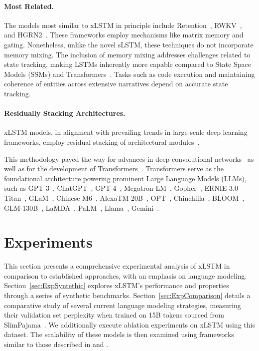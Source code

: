 \paragraph{Most Related.} The models most similar to xLSTM in principle include Retention~\citep{Sun:23arxiv}, RWKV~\citep{Peng:23arxivshort,Peng:24arxivshort}, and HGRN2~\citep{Qin:24arxiv}. These frameworks employ mechanisms like matrix memory and gating. Nonetheless, unlike the novel sLSTM, these techniques do not incorporate memory mixing. The inclusion of memory mixing addresses challenges related to state tracking, making LSTMs inherently more capable compared to State Space Models (SSMs) and Transformers~\citep{Merrill:24,Deletang:23}. Tasks such as code execution and maintaining coherence of entities across extensive narratives depend on accurate state tracking.

\paragraph{Residually Stacking Architectures.} xLSTM models, in alignment with prevailing trends in large-scale deep learning frameworks, employ residual stacking of architectural modules~\citep{Srivastava:15,He:16}.

This methodology paved the way for advances in deep convolutional networks~\citep{He:16} as well as for the development of Transformers~\citep{Vaswani:17}. Transformers serve as the foundational architecture powering prominent Large Language Models (LLMs), such as GPT-3~\citep{Brown:20short}, ChatGPT~\citep{Schulman:22short}, GPT-4~\citep{Achiam:23gpt4short}, Megatron-LM~\citep{Shoeybi:19}, Gopher~\citep{Rae:21short}, ERNIE 3.0 Titan~\citep{Wang:21arxivshort}, GLaM~\citep{Du:21glamshort}, Chinese M6~\citep{Lin:21}, AlexaTM 20B~\citep{Soltan:22}, OPT~\citep{Zhang:22opt}, Chinchilla~\citep{Hoffmann:22short}, BLOOM~\citep{Scao:22arxivshort}, GLM-130B~\citep{Zeng:22arxivshort}, LaMDA~\citep{Thoppilan:22short}, PaLM~\citep{Chowdhery:22short}, Llama~\citep{Touvron:23arxiv}, Gemini~\citep{GeminiTeam:23arxiv,Reid:24arxiv}.

\section{Experiments}
\label{sec:Exp}

This section presents a comprehensive experimental analysis of xLSTM in comparison to established approaches, with an emphasis on language modeling. Section~\ref{sec:ExpSyntethic} explores xLSTM's performance and properties through a series of synthetic benchmarks. Section~\ref{sec:ExpComparison} details a comparative study of several current language modeling strategies, measuring their validation set perplexity when trained on 15B tokens sourced from SlimPajama~\citep{Soboleva:23}. We additionally execute ablation experiments on xLSTM using this dataset. The scalability of these models is then examined using frameworks similar to those described in \citet{Kaplan:20} and \citet{Brown:20short}.

